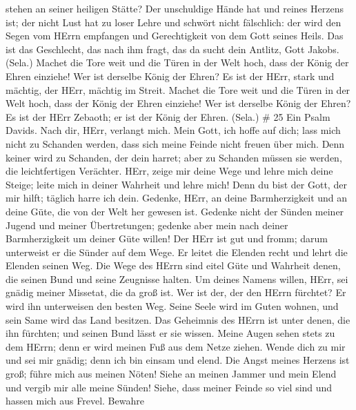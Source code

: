 stehen an seiner heiligen Stätte?  Der unschuldige Hände hat
und reines Herzens ist; der nicht Lust hat zu loser Lehre und schwört
nicht fälschlich:  der wird den Segen vom HErrn empfangen
und Gerechtigkeit von dem Gott seines Heils.  Das ist das
Geschlecht, das nach ihm fragt, das da sucht dein Antlitz, Gott Jakobs.
(Sela.)  Machet die Tore weit und die Türen in der Welt
hoch, dass der König der Ehren einziehe!  Wer ist derselbe
König der Ehren? Es ist der HErr, stark und mächtig, der HErr, mächtig
im Streit.  Machet die Tore weit und die Türen in der Welt
hoch, dass der König der Ehren einziehe!  Wer ist derselbe
König der Ehren? Es ist der HErr Zebaoth; er ist der König der Ehren.
(Sela.) \# 25  Ein Psalm Davids. Nach dir, HErr, verlangt
mich.  Mein Gott, ich hoffe auf dich; lass mich nicht zu
Schanden werden, dass sich meine Feinde nicht freuen über mich.
 Denn keiner wird zu Schanden, der dein harret; aber zu
Schanden müssen sie werden, die leichtfertigen Verächter. 
HErr, zeige mir deine Wege und lehre mich deine Steige; 
leite mich in deiner Wahrheit und lehre mich! Denn du bist der Gott, der
mir hilft; täglich harre ich dein.  Gedenke, HErr, an deine
Barmherzigkeit und an deine Güte, die von der Welt her gewesen ist.
 Gedenke nicht der Sünden meiner Jugend und meiner
Übertretungen; gedenke aber mein nach deiner Barmherzigkeit um deiner
Güte willen!  Der HErr ist gut und fromm; darum unterweist
er die Sünder auf dem Wege.  Er leitet die Elenden recht und
lehrt die Elenden seinen Weg.  Die Wege des HErrn sind
eitel Güte und Wahrheit denen, die seinen Bund und seine Zeugnisse
halten.  Um deines Namens willen, HErr, sei gnädig meiner
Missetat, die da groß ist.  Wer ist der, der den HErrn
fürchtet? Er wird ihn unterweisen den besten Weg.  Seine
Seele wird im Guten wohnen, und sein Same wird das Land besitzen.
 Das Geheimnis des HErrn ist unter denen, die ihn fürchten;
und seinen Bund lässt er sie wissen.  Meine Augen sehen
stets zu dem HErrn; denn er wird meinen Fuß aus dem Netze ziehen.
 Wende dich zu mir und sei mir gnädig; denn ich bin einsam
und elend.  Die Angst meines Herzens ist groß; führe mich
aus meinen Nöten!  Siehe an meinen Jammer und mein Elend
und vergib mir alle meine Sünden!  Siehe, dass meiner
Feinde so viel sind und hassen mich aus Frevel.  Bewahre

